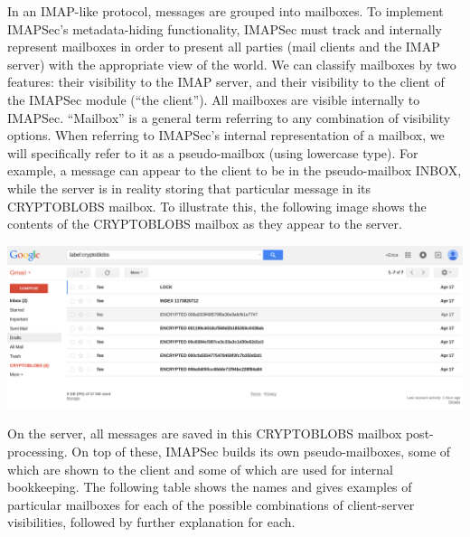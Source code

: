 \documentclass[pageno]{jpaper}
\newcommand{\project}{IMAPSec }
\newcommand{\projectnospace}{IMAPSec}
\begin{document}
In an IMAP-like protocol, messages are grouped into mailboxes. To implement \projectnospace's metadata-hiding functionality, \project must track and internally represent mailboxes in order to present all parties (mail clients and the IMAP server) with the appropriate view of the world. We can classify mailboxes by two features: their visibility to the IMAP server, and their visibility to the client of the \project module (``the client''). All mailboxes are visible internally to \projectnospace. ``Mailbox'' is a general term referring to any combination of visibility options. When referring to \projectnospace's internal representation of a mailbox, we will specifically refer to it as a pseudo-mailbox (using lowercase type). For example, a message can appear to the client to be in the pseudo-mailbox INBOX, while the server is in reality storing that particular message in its CRYPTOBLOBS mailbox. To illustrate this, the following image shows the contents of the CRYPTOBLOBS mailbox as they appear to the server.

\medskip

\includegraphics[width=\textwidth]{server_view}


On the server, all messages are saved in this CRYPTOBLOBS mailbox post-processing. On top of these, \project builds its own pseudo-mailboxes, some of which are shown to the client and some of which are used for internal bookkeeping. The following table shows the names and gives examples of particular mailboxes for each of the possible combinations of client-server visibilities, followed by further explanation for each.
\end{document}
